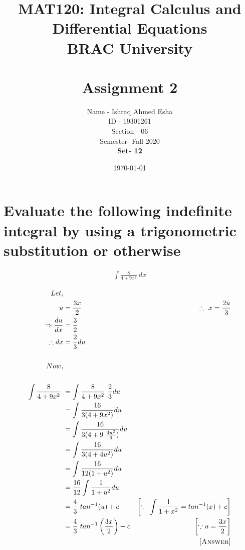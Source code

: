 \documentclass[12pt]{article}
\begin{document}
\title{MAT120: Integral Calculus and
Differential Equations \\
BRAC University \\\\
\textbf{Assignment 2}}

\author{Name - Ishraq Ahmed Esha \\ ID - 19301261 \\ Section - 06 \\ Semester- Fall 2020 \\ \textbf{Set- 12}}
\date{\today}
\maketitle
\pagebreak



\section{Evaluate the following indefinite integral by using a trigonometric substitution or otherwise}


\begin{align*}
    \int\frac{8}{4+9x^2}\ dx
\end{align*}

\begin{align*}
    Let,\\ u&= \frac{3x}{2} & \therefore\ x=\frac{2u}{3}\\
    \Rightarrow\frac{du}{dx}&= \frac{3}{2}\\
    \therefore dx&= \frac{2}{3}du\\\\
    Now,\\\\ \int\frac{8}{4+9x^2}\ &= \int\frac{8}{4+9x^2}\ \frac{2}{3}du\\
    &=\int\frac{16}{3(4+9x^2)}du\\
    &=\int\frac{16}{3(4+9\ \frac{4u^2}{9})}du\\
    &=\int\frac{16}{3(4+4u^2)}du\\
    &=\int\frac{16}{12(1+u^2)}du\\
    &=\frac{16}{12} \int\frac{1}{1+u^2}du\\
    &=\frac{4}{3}\ tan^{-1}(u)+c &  \left[\because\ \int\frac{1}{1+x^2}= tan^{-1}(x) + c\right]\\
    &=\frac{4}{3}\ tan^{-1}\left(\frac{3x}{2}\right)+c & \left[\because u=\frac{3x}{2}\right]\\
    & & \textsc{[Answer]}
\end{align*}
\pagebreak
\end{document}
